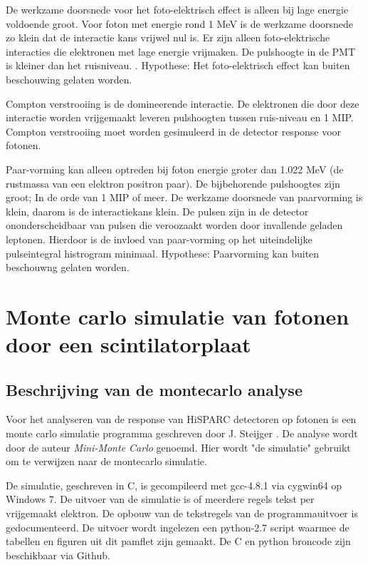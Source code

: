 \documentclass[a4paper,11pt]{article}
\begin{document}
De werkzame doorsnede voor het foto-elektrisch effect is alleen bij lage energie voldoende groot. Voor foton met energie rond 1 MeV is de werkzame doorsnede zo klein dat de interactie kans vrijwel nul is. Er zijn alleen foto-elektrische interacties die elektronen met lage energie vrijmaken. De pulshoogte in de PMT is kleiner dan het ruisniveau. \cite*{Steijger2010-gammas}. Hypothese: Het foto-elektrisch effect kan buiten beschouwing gelaten worden.

Compton verstrooiing is de domineerende interactie. De elektronen die door deze interactie worden vrijgemaakt leveren pulshoogten tussen ruis-niveau en 1 MIP. Compton verstrooiing moet worden gesimuleerd in de detector response voor fotonen.

Paar-vorming kan alleen optreden bij foton energie groter dan 1.022 MeV (de rustmassa van een elektron positron paar). De bijbehorende pulshoogtes zijn groot; In de orde van 1 MIP of meer. De werkzame doorsnede van paarvorming is klein, daarom is de interactiekans klein. De pulsen zijn in de detector ononderscheidbaar van pulsen die veroozaakt worden door invallende geladen leptonen. Hierdoor is de invloed van paar-vorming op het uiteindelijke pulseintegral histrogram minimaal. Hypothese: Paarvorming kan buiten beschouwng gelaten worden.


\section{Monte carlo simulatie van fotonen door een scintilatorplaat}

\subsection{Beschrijving van de montecarlo analyse}
Voor het analyseren van de response van HiSPARC detectoren op fotonen is een monte carlo simulatie programma geschreven door J. Steijger \cite*{Steijger2010-gammas}. De analyse wordt door de auteur \textit{Mini-Monte Carlo} genoemd. Hier wordt "de simulatie" gebruikt om te verwijzen naar de montecarlo simulatie.

De simulatie, geschreven in C, is gecompileerd met gcc-4.8.1 via cygwin64 op Windows 7. De uitvoer van de simulatie is of meerdere regels tekst per vrijgemaakt elektron. De opbouw van de tekstregels van de programmauitvoer is gedocumenteerd. De uitvoer wordt ingelezen een python-2.7 script waarmee de tabellen en figuren uit dit pamflet zijn gemaakt. De C en python broncode zijn beschikbaar via Github.
\end{document}

